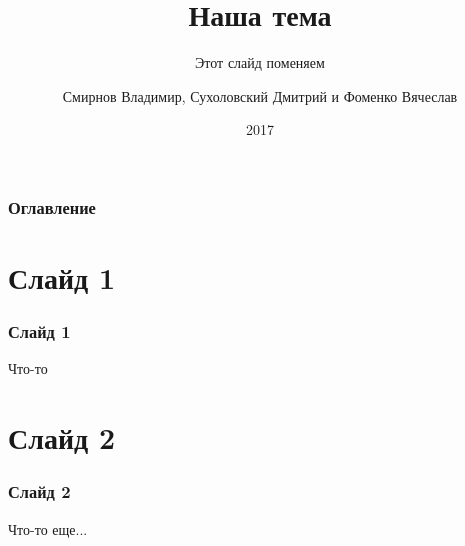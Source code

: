\documentclass[10pt]{beamer}
\title{Наша тема}
\subtitle{Этот слайд поменяем}
\author{Смирнов Владимир, Сухоловский Дмитрий и Фоменко Вячеслав}
\institute{Южный Федеральный Университет}
\date{2017}
\begin{document}
\frame{\titlepage}


\begin{frame}
\frametitle{Оглавление}
\tableofcontents
\end{frame}

\section{Слайд 1}
\begin{frame}
\frametitle{Слайд 1}
Что-то
\end{frame}

\section{Слайд 2}
\begin{frame}
\frametitle{Слайд 2}
Что-то еще...
\end{frame}
\end{document}
